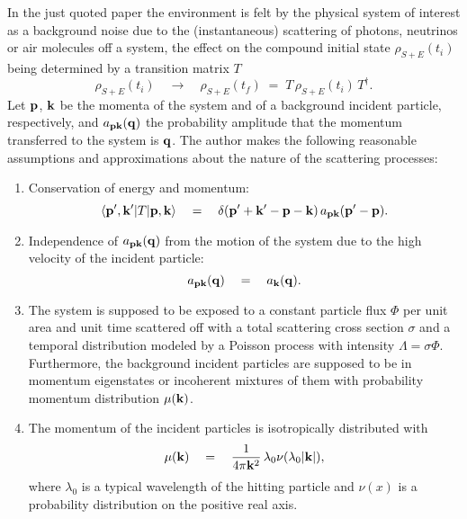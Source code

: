 \documentclass[12pt]{article}
\begin{document}
In the just quoted paper the environment is felt by the physical system
of interest as a background noise due to the (instantaneous) scattering of
photons, neutrinos or air molecules off a system, the effect on
the compound initial state $\rho_{S+E}(t_{i})$ being determined by
a transition matrix $T$
\begin{equation}
\rho_{S+E}(t_{i}) \quad \longrightarrow \quad \rho_{S+E}(t_{f}) \;
= \; T\,\rho_{S+E}(t_{i})\, T^{\dagger}.
\end{equation}
Let ${\bf p}$, ${\bf k}$ be the momenta of the system and of a
background incident particle, respectively, and $a_{\bf p k}({\bf
q})$ the probability amplitude that the momentum transferred to
the system is ${\bf q}$. The author makes the following reasonable
assumptions  and approximations about the nature of the scattering
processes:
\begin{enumerate}
\item Conservation of energy and momentum:
\[
\langle {\bf p}', {\bf k}'|T|{\bf p}, {\bf k} \rangle \quad =
\quad \delta({\bf p}' + {\bf k}' - {\bf p} - {\bf k})\, a_{\bf p
k}({\bf p}' - {\bf p}).
\]
\item Independence of $a_{\bf p k}({\bf q})$ from the motion of
the system due to the high velocity of the incident particle:
\[
a_{\bf p k}({\bf q}) \quad = \quad a_{\bf k}({\bf q}).
\]
\item The system is supposed to be exposed to a constant particle
flux $\Phi$ per unit area and unit time scattered off with a total
scattering cross section $\sigma$ and a temporal distribution
modeled by a Poisson process with intensity $\Lambda = \sigma
\Phi$. Furthermore, the background incident particles are supposed
to be in momentum eigenstates or incoherent mixtures of them with
probability momentum distribution $\mu({\bf k})$. \item The
momentum of the incident particles is isotropically distributed
with
\begin{equation}
\mu({\bf k}) \quad = \quad \frac{1}{4\pi{\bf k}^{2}}\,
\lambda_{0}\nu(\lambda_{0}|{\bf k}|),
\end{equation}
where $\lambda_{0}$ is a typical wavelength of the hitting
particle and $\nu(x)$ is a probability distribution on the
positive real axis.
\end{enumerate}
\end{document}
